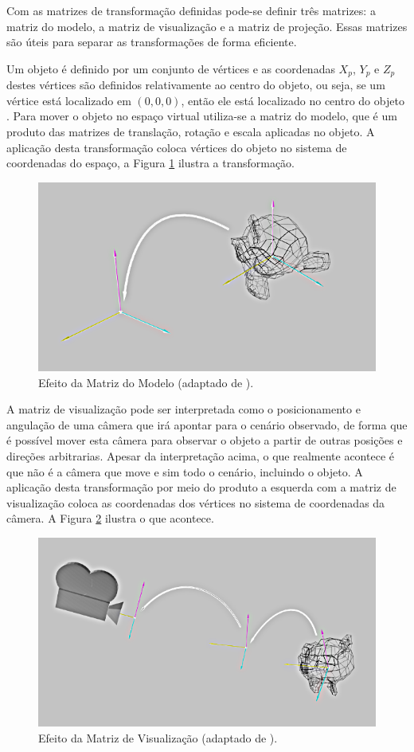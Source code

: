 {Com as matrizes de transformação definidas pode-se definir três matrizes: a matriz do modelo, a matriz de visualização e a matriz de projeção. Essas matrizes são úteis para separar as transformações de forma eficiente.

Um objeto é definido por um conjunto de vértices e as coordenadas $X_p$, $Y_p$ e $Z_p$ destes vértices são definidos relativamente ao centro do objeto, ou seja, se um vértice está localizado em $(0,0,0)$, então ele está localizado no centro do objeto \cite{openGlTutorial}. Para mover o objeto no espaço virtual utiliza-se a matriz do modelo, que é um produto das matrizes de translação, rotação e escala aplicadas no objeto. A aplicação desta transformação  coloca vértices do objeto no sistema de coordenadas do espaço, a Figura \ref{fig:mat_modelo} ilustra a transformação.

\begin{figure}[h!]
\centering
\includegraphics[width=.5\linewidth]{figs/TG_model_matrix_neg.png}
\caption{Efeito da Matriz do Modelo (adaptado de \cite{openGlTutorial}).}
\label{fig:mat_modelo}
\end{figure}


A matriz de visualização pode ser interpretada como o posicionamento e angulação de uma câmera que irá apontar para o cenário observado, de forma que é possível mover esta câmera para observar o objeto a partir de outras posições e direções arbitrarias. Apesar da interpretação acima, o  que realmente acontece é que não é a câmera que move e sim todo o cenário, incluindo o objeto. A aplicação desta transformação por meio do produto a esquerda com a matriz de visualização coloca as coordenadas dos vértices no sistema de coordenadas da câmera. A Figura \ref{fig:mat_visao} ilustra o que acontece.

\begin{figure}[h!]
\centering
\includegraphics[width=.5\linewidth]{figs/TG_view_matrix_neg.png}
\caption{Efeito da Matriz de Visualização (adaptado de \cite{openGlTutorial}).}
\label{fig:mat_visao}
\end{figure}

}
